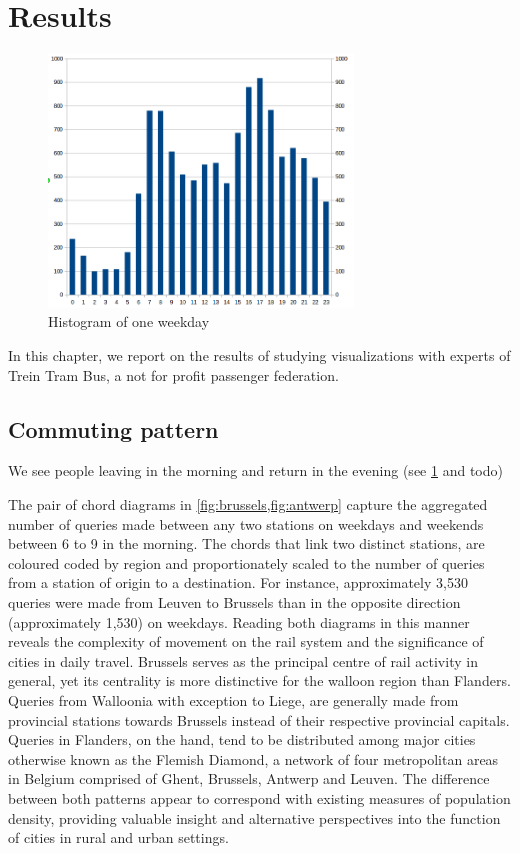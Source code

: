 \documentclass{sig-alternate}
\begin{document}
\section{Results}
\label{sec:results}

\begin{figure}
\centering
\includegraphics[width=8.1cm,align=center]{histogram}
\caption{Histogram of one weekday}
\label{fig:brussels}
\end{figure}

In this chapter, we report on the results of studying visualizations with experts of Trein Tram Bus, a not for profit passenger federation.

\subsection{Commuting pattern}

We see people leaving in the morning and return in the evening (see \cref{fig:brussels} and todo)

The pair of chord diagrams in \cref{fig:brussels,fig:antwerp} capture the aggregated number of queries made between any two stations on weekdays and weekends between 6 to 9 in the morning.
The chords that link two distinct stations, are coloured coded by region and proportionately scaled to the number of queries from a station of origin to a destination.
For instance, approximately 3,530 queries were made from Leuven to Brussels than in the opposite direction (approximately 1,530) on weekdays.
Reading both diagrams in this manner reveals the complexity of movement on the rail system and the significance of cities in daily travel.
Brussels serves as the principal centre of rail activity in general, yet its centrality is more distinctive for the walloon region than Flanders.
Queries from Walloonia with exception to Liege, are generally made from provincial stations towards Brussels instead of their respective provincial capitals.
Queries in Flanders, on the hand, tend to be distributed among major cities otherwise known as the Flemish Diamond, a network of four metropolitan areas in Belgium comprised of Ghent, Brussels, Antwerp and Leuven.
The difference between both patterns appear to correspond with existing measures of population density, providing valuable insight and alternative perspectives into the function of cities in rural and urban settings.
\end{document}
